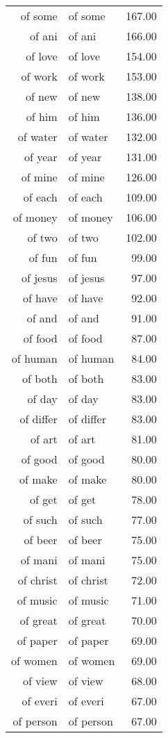 \begin{table}[ht]
\begin{tabular}{rlr}
  of some & of some & 167.00 \\ 
  of ani & of ani & 166.00 \\ 
  of love & of love & 154.00 \\ 
  of work & of work & 153.00 \\ 
  of new & of new & 138.00 \\ 
  of him & of him & 136.00 \\ 
  of water & of water & 132.00 \\ 
  of year & of year & 131.00 \\ 
  of mine & of mine & 126.00 \\ 
  of each & of each & 109.00 \\ 
  of money & of money & 106.00 \\ 
  of two & of two & 102.00 \\ 
  of fun & of fun & 99.00 \\ 
  of jesus & of jesus & 97.00 \\ 
  of have & of have & 92.00 \\ 
  of and & of and & 91.00 \\ 
  of food & of food & 87.00 \\ 
  of human & of human & 84.00 \\ 
  of both & of both & 83.00 \\ 
  of day & of day & 83.00 \\ 
  of differ & of differ & 83.00 \\ 
  of art & of art & 81.00 \\ 
  of good & of good & 80.00 \\ 
  of make & of make & 80.00 \\ 
  of get & of get & 78.00 \\ 
  of such & of such & 77.00 \\ 
  of beer & of beer & 75.00 \\ 
  of mani & of mani & 75.00 \\ 
  of christ & of christ & 72.00 \\ 
  of music & of music & 71.00 \\ 
  of great & of great & 70.00 \\ 
  of paper & of paper & 69.00 \\ 
  of women & of women & 69.00 \\ 
  of view & of view & 68.00 \\ 
  of everi & of everi & 67.00 \\ 
  of person & of person & 67.00 \\ 

\end{tabular}
\end{table}
